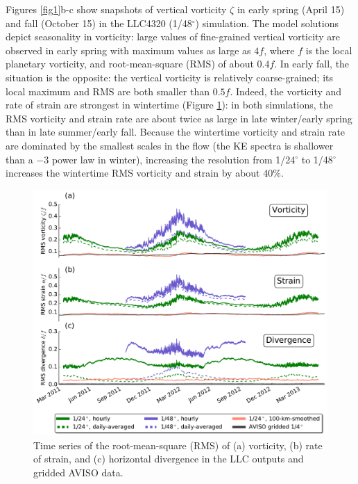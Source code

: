 \documentclass[grl]{agutex2015}
\begin{document}
\begin{article}
Figures \ref{fig1}b-c show snapshots of vertical vorticity $\zeta$ in early spring
(April 15) and fall (October 15) in the LLC4320 (1/48$^\circ$) simulation.
The model solutions depict seasonality in vorticity: large values of
fine-grained vertical vorticity are observed in early spring with maximum
values as large as $4f$, where $f$ is
the local planetary vorticity, and root-mean-square (RMS) of about $0.4f$. In early
fall, the situation is the opposite: the vertical vorticity is relatively coarse-grained;
its local maximum and RMS are both smaller than $0.5f$.
Indeed, the vorticity and rate of strain are strongest in wintertime (Figure \ref{fig2}):
in both simulations, the RMS vorticity and strain rate are about twice as large in
late winter/early spring
than in late summer/early fall. Because the wintertime vorticity and strain rate
are dominated by the smallest scales in the flow (the KE spectra is shallower than
a $-3$ power law in winter), increasing the resolution from
1/24$^\circ$ to 1/48$^\circ$ increases the wintertime RMS vorticity
and strain by about 40$\%$.

 \begin{figure}[ht]
   \begin{center}
     \includegraphics[width=.75\textwidth]{figs/fig2.pdf}
  \caption{Time series of the root-mean-square (RMS) of (a) vorticity,
  (b) rate of strain, and (c) horizontal divergence in the LLC outputs and gridded AVISO data.}
  \label{fig2}
  \end{center}
\end{figure}


\end{article}
\end{document}
